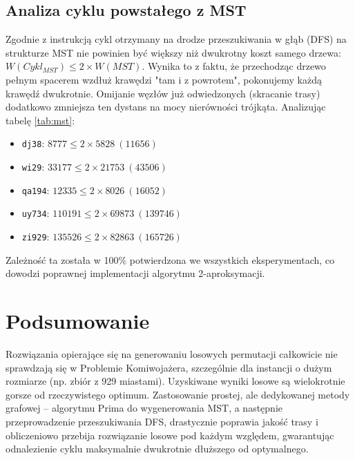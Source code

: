 \documentclass[12pt,a4paper]{article}
\begin{document}
\subsection{Analiza cyklu powstałego z MST}
Zgodnie z instrukcją cykl otrzymany na drodze przeszukiwania w głąb (DFS) na strukturze MST nie powinien być większy niż dwukrotny koszt samego drzewa: $W(Cykl_{MST}) \le 2 \times W(MST)$. Wynika to z faktu, że przechodząc drzewo pełnym spacerem wzdłuż krawędzi "tam i z powrotem", pokonujemy każdą krawędź dwukrotnie. Omijanie węzłów już odwiedzonych (skracanie trasy) dodatkowo zmniejsza ten dystans na mocy nierówności trójkąta.
Analizując tabelę \ref{tab:mst}:
\begin{itemize}
    \item \texttt{dj38}: $8777 \le 2 \times 5828 \ (11656)$
    \item \texttt{wi29}: $33177 \le 2 \times 21753 \ (43506)$
    \item \texttt{qa194}: $12335 \le 2 \times 8026 \ (16052)$
    \item \texttt{uy734}: $110191 \le 2 \times 69873 \ (139746)$
    \item \texttt{zi929}: $135526 \le 2 \times 82863 \ (165726)$
\end{itemize}
Zależność ta została w 100\% potwierdzona we wszystkich eksperymentach, co dowodzi poprawnej implementacji algorytmu 2-aproksymacji.

\section{Podsumowanie}
Rozwiązania opierające się na generowaniu losowych permutacji całkowicie nie sprawdzają się w Problemie Komiwojażera, szczególnie dla instancji o dużym rozmiarze (np. zbiór z 929 miastami). Uzyskiwane wyniki losowe są wielokrotnie gorsze od rzeczywistego optimum. Zastosowanie prostej, ale dedykowanej metody grafowej – algorytmu Prima do wygenerowania MST, a następnie przeprowadzenie przeszukiwania DFS, drastycznie poprawia jakość trasy i obliczeniowo przebija rozwiązanie losowe pod każdym względem, gwarantując odnalezienie cyklu maksymalnie dwukrotnie dłuższego od optymalnego.
\end{document}
